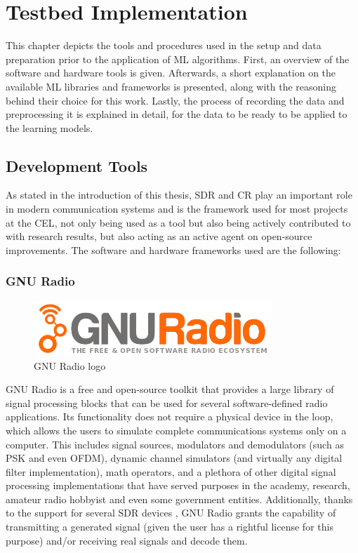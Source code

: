 \acresetall
\chapter{Testbed Implementation}\label{chapter:implementation}\label{ch:implementation}
This chapter depicts the tools and procedures used in the setup and data preparation prior to the application of \ac{ML} algorithms. First, an overview of the software and hardware tools is given. Afterwards, a short explanation on the available \ac{ML} libraries and frameworks is presented, along with the reasoning behind their choice for this work. Lastly, the process of recording the data and preprocessing it is explained in detail, for the data to be ready to be applied to the learning models.
\section{Development Tools}\label{ch:tools}
As stated in the introduction of this thesis, \ac{SDR} and \ac{CR} play an important role in modern communication systems and is the framework used for most projects at the \ac{CEL}, not only being used as a tool but also being actively contributed to with research results, but also acting as an active agent on open-source improvements. The software and hardware frameworks used are the following:
\subsection{GNU Radio}
\begin{figure}[htb]
    \centering
      \includegraphics[width=0.8\textwidth]{figures/gnuradio_logo}
      \caption{GNU Radio logo}
      \label{fig:gnuradio}
\end{figure}
GNU Radio \cite{GNURadio2016} is a free and open-source toolkit that provides a large library of signal processing blocks that can be used for several software-defined radio applications. Its functionality does not require a physical device in the loop, which allows the users to simulate complete communications systems only on a computer. This includes signal sources, modulators and demodulators (such as \ac{PSK} and even \ac{OFDM}), dynamic channel simulators (and virtually any digital filter implementation), math operators, and a plethora of other digital signal processing implementations that have served purposes in the academy, research, amateur radio hobbyist and even some government entities. Additionally, thanks to the support for several \ac{SDR} devices \cite{gnuradiohw}, GNU Radio grants the capability of transmitting a generated signal (given the user has a rightful license for this purpose) and/or receiving real signals and decode them.\\

